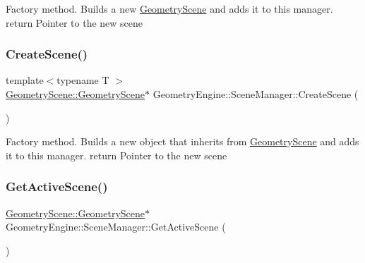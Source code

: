 Factory method. Builds a new \mbox{\hyperlink{namespace_geometry_engine_1_1_geometry_scene}{Geometry\+Scene}} and adds it to this manager. return Pointer to the new scene \mbox{\label{class_geometry_engine_1_1_scene_manager_acccb8a2f57b58cc96f77c7316b99248e}} 
\subsubsection{\texorpdfstring{CreateScene()}{CreateScene()}\hspace{0.1cm}{\footnotesize\ttfamily [2/2]}}
{\footnotesize\ttfamily template$<$typename T $>$ \\
\mbox{\hyperlink{class_geometry_engine_1_1_geometry_scene_1_1_geometry_scene}{Geometry\+Scene\+::\+Geometry\+Scene}}$\ast$ Geometry\+Engine\+::\+Scene\+Manager\+::\+Create\+Scene (\begin{DoxyParamCaption}{ }\end{DoxyParamCaption})\hspace{0.3cm}{\ttfamily [inline]}}

Factory method. Builds a new object that inherits from \mbox{\hyperlink{namespace_geometry_engine_1_1_geometry_scene}{Geometry\+Scene}} and adds it to this manager. return Pointer to the new scene \mbox{\label{class_geometry_engine_1_1_scene_manager_a8d9620773e7ee65a82aa13bb4a1a1fdf}} 
\subsubsection{\texorpdfstring{GetActiveScene()}{GetActiveScene()}}
{\footnotesize\ttfamily \mbox{\hyperlink{class_geometry_engine_1_1_geometry_scene_1_1_geometry_scene}{Geometry\+Scene\+::\+Geometry\+Scene}}$\ast$ Geometry\+Engine\+::\+Scene\+Manager\+::\+Get\+Active\+Scene (\begin{DoxyParamCaption}{ }\end{DoxyParamCaption})\hspace{0.3cm}{\ttfamily [inline]}}

